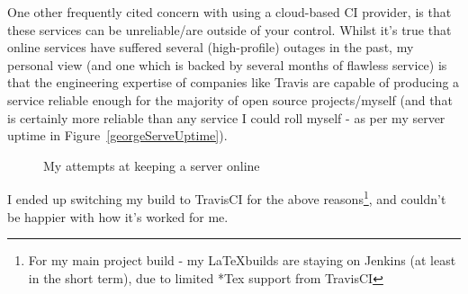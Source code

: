 One other frequently cited concern with using a cloud-based CI provider, is that
these services can be unreliable/are outside of your control. Whilst it's true
that online services have suffered several (high-profile) outages in the past,
my personal view (and one which is backed by several months of flawless service)
is that the engineering expertise of companies like Travis are capable of producing
a service reliable enough for the majority of open source projects/myself
(and that is certainly more reliable than any service I could roll myself - as per
my server uptime in Figure~\ref{georgeServeUptime}).

\begin{figure}
  \noindent{}
  \centering
  \caption{My attempts at keeping a server online}
  \label{fig:georgeServeUptime}
\end{figure}

I ended up switching my build to TravisCI for the above reasons\footnote{For my
main project build - my \LaTeX builds are staying on Jenkins
(at least in the short term), due to limited *Tex support from TravisCI}, and
couldn't be happier with how it's worked for me.
